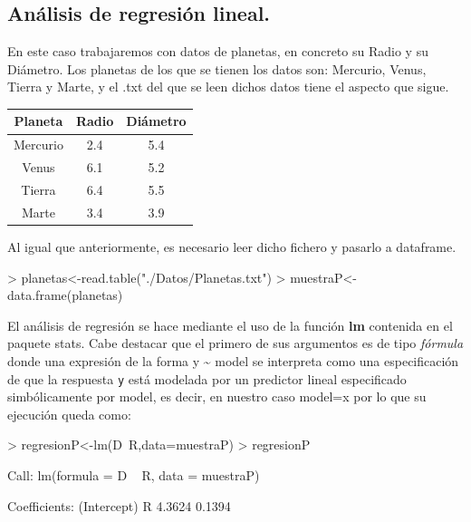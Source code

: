 \documentclass [a4paper] {article}
\begin{document}
\subsection{Análisis de regresión lineal.}
En este caso trabajaremos con datos de planetas, en concreto su Radio y su Diámetro. Los planetas de los que se tienen
los datos son: Mercurio, Venus, Tierra y Marte, y el .txt del que se leen dichos datos tiene el aspecto que
sigue.
\begin{table}[H]
\begin{center}
\begin{tabular}{|c|c|c|}
\hline
Planeta & Radio & Diámetro\\
\hline \hline
Mercurio & 2.4 & 5.4 \\ \hline
Venus & 6.1 & 5.2 \\ \hline
Tierra & 6.4 & 5.5 \\ \hline
Marte & 3.4 & 3.9 \\ \hline
\end{tabular}
\end{center}
\end{table}

\bigskip
Al igual que anteriormente, es necesario leer dicho fichero y pasarlo a dataframe.
\begin{Schunk}
\begin{Sinput}
> planetas<-read.table("./Datos/Planetas.txt")
> muestraP<-data.frame(planetas)
\end{Sinput}
\end{Schunk}

\bigskip
El análisis de regresión se hace mediante el uso de la función \textbf{lm} contenida en el paquete stats. Cabe destacar que el primero
de sus argumentos es de tipo \textit{fórmula} donde una expresión de la forma y \textasciitilde{} model se interpreta como una especificación de que 
la respuesta \texttt{y} está modelada por un predictor lineal especificado simbólicamente por model, es decir, en nuestro caso model=x por lo que
su ejecución queda como:
\begin{Schunk}
\begin{Sinput}
> regresionP<-lm(D~R,data=muestraP)
> regresionP
\end{Sinput}
\begin{Soutput}
Call:
lm(formula = D ~ R, data = muestraP)

Coefficients:
(Intercept)            R  
     4.3624       0.1394  
\end{Soutput}
\end{Schunk}
\end{document}
